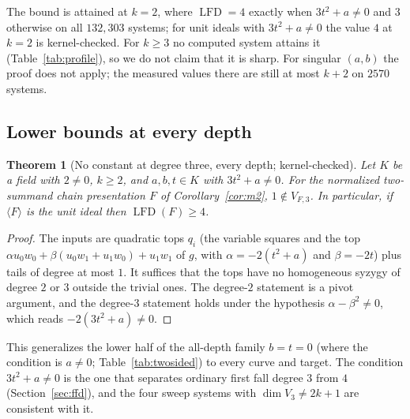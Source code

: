 \documentclass[11pt]{article}
\newtheorem{theorem}{Theorem}
\theoremstyle{definition}\newtheorem{definition}[theorem]{Definition}
\theoremstyle{remark}\newtheorem{remark}[theorem]{Remark}
\newcommand{\lfd}{\operatorname{LFD}}
\begin{document}
The bound is attained at $k=2$, where $\lfd=4$ exactly when $3t^2+a\ne0$
and $3$ otherwise on all $132{,}303$ systems; for unit ideals with
$3t^2+a\ne0$ the value $4$ at $k=2$ is kernel-checked. For $k\ge3$ no
computed system attains it (Table~\ref{tab:profile}), so we do not claim
that it is sharp. For singular $(a,b)$ the proof does not apply; the
measured values there are still at most $k+2$ on $2570$ systems.

\subsection{Lower bounds at every depth}\label{sec:lower}
\begin{theorem}[No constant at degree three, every depth; kernel-checked]\label{thm:three}
Let $K$ be a field with $2\ne0$, $k\ge2$, and $a,b,t\in K$ with
$3t^2+a\ne0$. For the normalized two-summand chain presentation $F$ of
Corollary~\ref{cor:m2}, $1\notin V_{F,3}$. In particular, if $\langle
F\rangle$ is the unit ideal then $\lfd(F)\ge4$.
\end{theorem}
\begin{proof}
The inputs are quadratic tops $q_i$ (the variable squares and the top
$\alpha u_0w_0+\beta(u_0w_1+u_1w_0)+u_1w_1$ of $g$, with $\alpha=-2(t^2+a)$ and
$\beta=-2t$) plus tails of degree at most $1$. It suffices that the tops
have no homogeneous syzygy of degree $2$ or $3$ outside the trivial ones.
The degree-$2$ statement is a pivot argument, and the degree-$3$ statement
holds under the hypothesis $\alpha-\beta^2\ne0$, which reads
$-2(3t^2+a)\ne0$.
\end{proof}
This generalizes the lower half of the all-depth family $b=t=0$ (where the
condition is $a\ne0$; Table~\ref{tab:twosided}) to every curve and target.
The condition $3t^2+a\ne0$ is the one that separates ordinary first fall
degree $3$ from $4$ (Section~\ref{sec:ffd}), and the four sweep systems with
$\dim V_3\ne2k+1$ are consistent with it.
\end{document}
